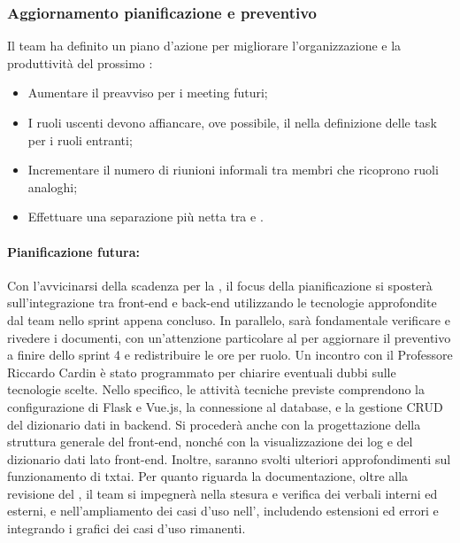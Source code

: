 \subsubsection{Aggiornamento pianificazione e preventivo}
\par Il team ha definito un piano d'azione per migliorare l'organizzazione e la produttività del prossimo :
\begin{itemize}
  \item Aumentare il preavviso per i meeting futuri;
  \item I ruoli uscenti devono affiancare, ove possibile, il \Responsabile{} nella definizione delle task per i ruoli entranti;
  \item Incrementare il numero di riunioni informali tra membri che ricoprono ruoli analoghi;
  \item Effettuare una separazione più netta tra  e .
\end{itemize}

\paragraph*{Pianificazione futura:}
\par Con l'avvicinarsi della scadenza per la \RTB, il focus della pianificazione si sposterà sull'integrazione tra front-end e back-end utilizzando le tecnologie approfondite dal team nello sprint appena concluso. In parallelo, sarà fondamentale verificare e rivedere i documenti, con un'attenzione particolare al \PdP per aggiornare il preventivo a finire dello sprint 4 e redistribuire le ore per ruolo. Un incontro con il Professore Riccardo Cardin è stato programmato per chiarire eventuali dubbi sulle tecnologie scelte.
Nello specifico, le attività tecniche previste comprendono la configurazione di Flask e Vue.js, la connessione al database, e la gestione CRUD del dizionario dati in backend. Si procederà anche con la progettazione della struttura generale del front-end, nonché con la visualizzazione dei log e del dizionario dati lato front-end. Inoltre, saranno svolti ulteriori approfondimenti sul funzionamento di txtai.
Per quanto riguarda la documentazione, oltre alla revisione del \PdP, il team si impegnerà nella stesura e verifica dei verbali interni ed esterni, e nell'ampliamento dei casi d'uso nell'\AdR, includendo estensioni ed errori e integrando i grafici dei casi d'uso rimanenti.

